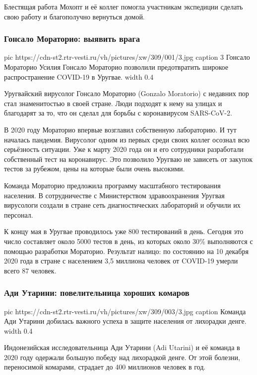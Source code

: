 Блестящая работа Мохопт и её коллег помогла участникам экспедиции сделать свою
работу и благополучно вернуться домой.


\subsubsection{Гонсало Мораторио: выявить врага}

\ifcmt
  pic https://cdn-st2.rtr-vesti.ru/vh/pictures/xw/309/001/3.jpg
	caption 3 Гонсало Мораторио Усилия Гонсало Мораторио позволили предотвратить широкое распространение COVID-19 в Уругвае.
  width 0.4
\fi

Уругвайский вирусолог Гонсало Мораторио (Gonzalo Moratorio) с недавних пор стал
знаменитостью в своей стране. Люди подходят к нему на улицах и благодарят за
то, что он сделал для борьбы с коронавирусом SARS-CoV-2.

В 2020 году Мораторио впервые возглавил собственную лабораторию. И тут началась
пандемия. Вирусолог одним из первых среди своих коллег осознал всю серьёзность
ситуации. Уже к марту 2020 года он и его сотрудники разработали собственный
тест на коронавирус. Это позволило Уругваю не зависеть от закупок тестов за
рубежом, цены на которые были очень высокими.

Команда Мораторио предложила программу масштабного тестирования населения. В
сотрудничестве с Министерством здравоохранения Уругвая вирусологи создали в
стране сеть диагностических лабораторий и обучили их персонал.

К концу мая в Уругвае проводилось уже 800 тестирований в день. Сегодня это
число составляет около 5000 тестов в день, из которых около 30\% выполняются с
помощью разработки Мораторио. Результат налицо: по состоянию на 10 декабря 2020
года в стране с населением 3,5 миллиона человек от COVID-19 умерли всего 87
человек.

\subsubsection{Ади Утарини: повелительница хороших комаров}

\ifcmt
  pic https://cdn-st2.rtr-vesti.ru/vh/pictures/xw/309/003/3.jpg
	caption Команда Ади Утарини добилась важного успеха в защите населения от лихорадки денге.
  width 0.4
\fi

Индонезийская исследовательница Ади Утарини (Adi Utarini) и её команда в 2020
году одержали большую победу над лихорадкой денге. От этой болезни, переносимой
комарами, страдает до 400 миллионов человек в год.


